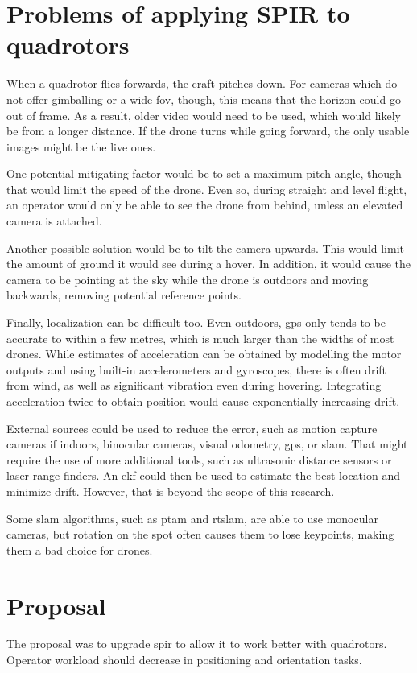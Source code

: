 \section{Problems of applying SPIR to quadrotors}
  When a quadrotor flies forwards, the craft pitches down.
  For cameras which do not offer gimballing or a wide \gls{fov}, though, this means that the horizon could go out of frame.
  As a result, older video would need to be used, which would likely be from a longer distance.
  If the drone turns while going forward, the only usable images might be the live ones.

  One potential mitigating factor would be to set a maximum pitch angle, though that would limit the speed of the drone.
  Even so, during straight and level flight, an operator would only be able to see the drone from behind, unless an elevated camera is attached.

  Another possible solution would be to tilt the camera upwards.
  This would limit the amount of ground it would see during a hover.
  In addition, it would cause the camera to be pointing at the sky while the drone is outdoors and moving backwards, removing potential reference points.

  Finally, localization can be difficult too.
  Even outdoors, \gls{gps} only tends to be accurate to within a few metres, which is much larger than the widths of most drones.
  While estimates of acceleration can be obtained by modelling the motor outputs and using built-in accelerometers and gyroscopes, there is often drift from wind, as well as significant vibration even during hovering.
  Integrating acceleration twice to obtain position would cause exponentially increasing drift.

  External sources could be used to reduce the error, such as motion capture cameras if indoors, binocular cameras, visual odometry, \gls{gps}, or \gls{slam}.
  That might require the use of more additional tools, such as ultrasonic distance sensors or laser range finders.
  An \gls{ekf} could then be used to estimate the best location and minimize drift.
  However, that is beyond the scope of this research.

  Some \gls{slam} algorithms, such as \gls{ptam} and \gls{rtslam}, are able to use monocular cameras, but rotation on the spot often causes them to lose keypoints, making them a bad choice for drones.

\section{Proposal}
  The proposal was to upgrade \gls{spir} to allow it to work better with quadrotors.
  Operator workload should decrease in positioning and orientation tasks.

